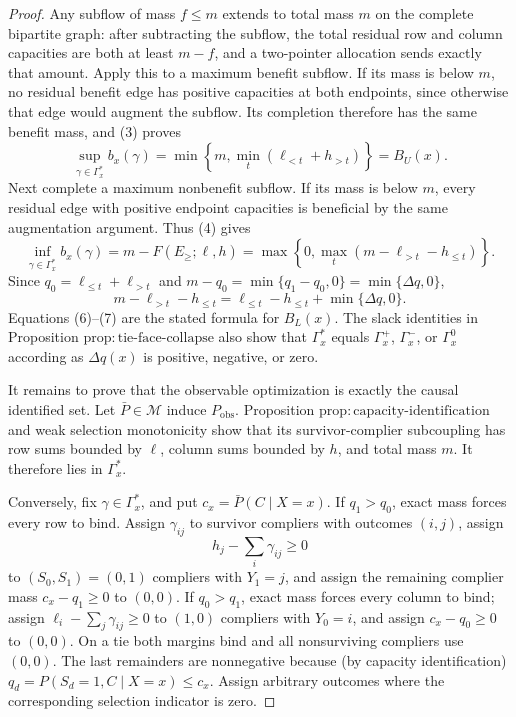 \documentclass{article}
\begin{document}
\begin{proof}
Any subflow of mass \(f\le m\) extends to total mass \(m\) on the
complete bipartite graph: after subtracting the subflow, the total
residual row and column capacities are both at least \(m-f\), and a
two-pointer allocation sends exactly that amount.  Apply this to a
maximum benefit subflow.  If its mass is below \(m\), no residual benefit
edge has positive capacities at both endpoints, since otherwise that
edge would augment the subflow.  Its completion therefore has the same
benefit mass, and (3) proves
\[
\sup_{\gamma\in\Gamma_x^{\ast}}b_x(\gamma)
=\min\left\{m,\min_t(\ell_{<t}+h_{>t})\right\}=B_U(x).
\tag{5}
\]
Next complete a maximum nonbenefit subflow.  If its mass is below \(m\),
every residual edge with positive endpoint capacities is beneficial by
the same augmentation argument.  Thus (4) gives
\[
\inf_{\gamma\in\Gamma_x^{\ast}}b_x(\gamma)
=m-F(E_{\ge};\ell,h)
=\max\left\{0,\max_t(m-\ell_{>t}-h_{\le t})\right\}.
\tag{6}
\]
Since \(q_0=\ell_{\le t}+\ell_{>t}\) and
\(m-q_0=\min\{q_1-q_0,0\}=\min\{\Delta q,0\}\),
\[
m-\ell_{>t}-h_{\le t}
=\ell_{\le t}-h_{\le t}+\min\{\Delta q,0\}.
\tag{7}
\]
Equations (6)--(7) are the stated formula for \(B_L(x)\).  The slack
identities in Proposition \(\mathrm{prop{:}tie\text{-}face\text{-}collapse}\)
also show that \(\Gamma_x^{\ast}\) equals \(\Gamma_x^+\),
\(\Gamma_x^-\), or \(\Gamma_x^0\) according as \(\Delta q(x)\) is
positive, negative, or zero.

It remains to prove that the observable optimization is exactly the
causal identified set.  Let \(\bar P\in\mathcal M\) induce
\(P_{\mathrm{obs}}\).  Proposition
\(\mathrm{prop{:}capacity\text{-}identification}\) and weak selection
monotonicity show that its survivor-complier subcoupling has row sums
bounded by \(\ell\), column sums bounded by \(h\), and total mass \(m\).
It therefore lies in \(\Gamma_x^{\ast}\).

Conversely, fix \(\gamma\in\Gamma_x^{\ast}\), and put
\(c_x=\bar P(C\mid X=x)\).  If \(q_1>q_0\), exact mass forces every row
to bind.  Assign \(\gamma_{ij}\) to survivor compliers with outcomes
\((i,j)\), assign
\[
h_j-\sum_i\gamma_{ij}\ge0
\]
to \((S_0,S_1)=(0,1)\) compliers with \(Y_1=j\), and assign the remaining
complier mass \(c_x-q_1\ge0\) to \((0,0)\).  If \(q_0>q_1\), exact mass
forces every column to bind; assign
\(\ell_i-\sum_j\gamma_{ij}\ge0\) to \((1,0)\) compliers with \(Y_0=i\),
and assign \(c_x-q_0\ge0\) to \((0,0)\).  On a tie both margins bind and
all nonsurviving compliers use \((0,0)\).  The last remainders are
nonnegative because (by capacity identification)
\(q_d=P(S_d=1,C\mid X=x)\le c_x\).  Assign arbitrary outcomes where the
corresponding selection indicator is zero.


\end{proof}
\end{document}
